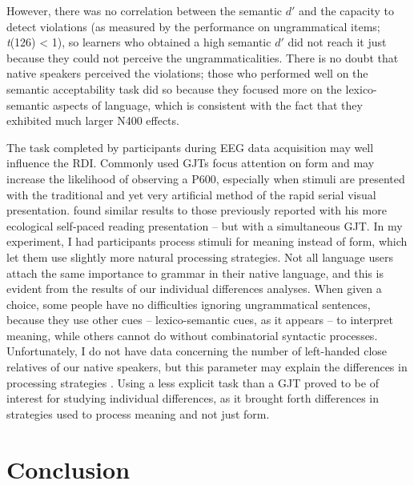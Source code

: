 \documentclass[output=paper,colorlinks,citecolor=brown,modfonts,nonflat]{../langscibook}
\begin{document}
However, there was no correlation between the semantic $d′$ and the capacity to detect violations (as measured by the performance on ungrammatical items; \textit{t}(126) < 1), so learners who obtained a high semantic $d′$ did not reach it just because they could not perceive the ungrammaticalities. There is no doubt that native speakers perceived the violations; those who performed well on the semantic acceptability task did so because they focused more on the lexico-semantic aspects of language, which is consistent with the fact that they exhibited much larger N400 effects.

The task completed by participants during EEG data acquisition may well influence the RDI. Commonly used GJTs focus attention on form and may increase the likelihood of observing a P600, especially when stimuli are presented with the traditional and yet very artificial method of the rapid serial visual presentation. \citet{Tanner2019} found similar results to those previously reported with his more ecological self-paced reading presentation – but with a simultaneous GJT. In my experiment, I had participants process stimuli for meaning instead of form, which let them use slightly more natural processing strategies. Not all language users attach the same importance to grammar in their native language, and this is evident from the results of our individual differences analyses. When given a choice, some people have no difficulties ignoring ungrammatical sentences, because they use other cues – lexico-semantic cues, as it appears – to interpret meaning, while others cannot do without combinatorial syntactic processes. Unfortunately, I do not have data concerning the number of left-handed close relatives of our native speakers, but this parameter may explain the differences in processing strategies \citep{GreyEtAl2017}. Using a less explicit task than a GJT proved to be of interest for studying individual differences, as it brought forth differences in strategies used to process meaning and not just form. 

\section{Conclusion}
\end{document}
